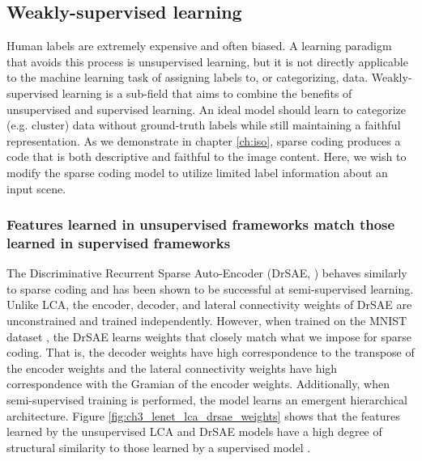 \subsection{Weakly-supervised learning}

Human labels are extremely expensive and often biased. A learning paradigm that avoids this process is unsupervised learning, but it is not directly applicable to the machine learning task of assigning labels to, or categorizing, data. Weakly-supervised learning is a sub-field that aims to combine the benefits of unsupervised and supervised learning. An ideal model should learn to categorize (e.g. cluster) data without ground-truth labels while still maintaining a faithful representation. As we demonstrate in chapter \ref{ch:iso}, sparse coding produces a code that is both descriptive and faithful to the image content. Here, we wish to modify the sparse coding model to utilize limited label information about an input scene.

\subsubsection{Features learned in unsupervised frameworks match those learned in supervised frameworks}
The Discriminative Recurrent Sparse Auto-Encoder (DrSAE, \cite{rolfe2013discriminative}) behaves similarly to sparse coding and has been shown to be successful at semi-supervised learning. Unlike LCA, the encoder, decoder, and lateral connectivity weights of DrSAE are unconstrained and trained independently. However, when trained on the MNIST dataset \parencite{lecun1998mnist}, the DrSAE learns weights that closely match what we impose for sparse coding. That is, the decoder weights have high correspondence to the transpose of the encoder weights and the lateral connectivity weights have high correspondence with the Gramian of the encoder weights. Additionally, when semi-supervised training is performed, the model learns an emergent hierarchical architecture. Figure \ref{fig:ch3_lenet_lca_drsae_weights} shows that the features learned by the unsupervised LCA and DrSAE models have a high degree of structural similarity to those learned by a supervised model \parencite{lecun1998gradient}.

